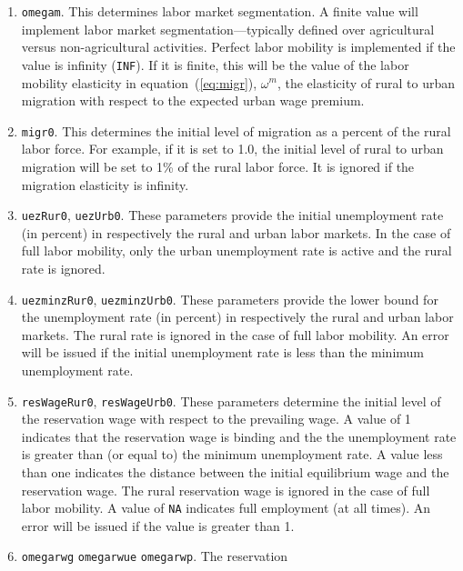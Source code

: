 \begin{enumerate}
   \item \texttt{omegam}. This determines labor market segmentation. A finite
         value will implement labor market segmentation---typically defined over
         agricultural versus non-agricultural activities. Perfect labor mobility
         is implemented if the value is infinity (\texttt{INF}). If it is
         finite, this will be the value of the labor mobility elasticity in
         equation~(\ref{eq:migr}), $\omega^m$, the elasticity of rural to urban
         migration with respect to the expected urban wage premium.
   \item \texttt{migr0}. This determines the initial level of migration as a
         percent of the rural labor force. For example, if it is set to 1.0,
         the initial level of rural to urban migration will be set to 1\% of the
         rural labor force. It is ignored if the migration elasticity is
         infinity.
   \item \texttt{uezRur0}, \texttt{uezUrb0}. These parameters provide the
         initial unemployment rate (in percent) in respectively the rural and
         urban labor markets. In the case of full labor mobility, only the urban
         unemployment rate is active and the rural rate is ignored.
   \item \texttt{uezminzRur0}, \texttt{uezminzUrb0}. These parameters provide
         the lower bound for the unemployment rate (in percent) in respectively
         the rural and urban labor markets. The rural rate is ignored in the
         case of full labor mobility. An error will be issued if the initial
         unemployment rate is less than the minimum unemployment rate.
   \item \texttt{resWageRur0}, \texttt{resWageUrb0}. These parameters determine
         the initial level of the reservation wage with respect to the
         prevailing wage. A value of 1 indicates that the reservation wage is
         binding and the the unemployment rate is greater than (or equal to) the
         minimum unemployment rate. A value less than one indicates the distance
         between the initial equilibrium wage and the reservation wage. The
         rural reservation wage is ignored in the case of full labor mobility.
         A value of \texttt{NA} indicates full employment (at all times). An
         error will be issued if the value is greater than 1.
   \item \texttt{omegarwg} \texttt{omegarwue} \texttt{omegarwp}. The reservation

\end{enumerate}
